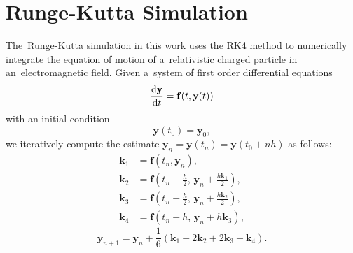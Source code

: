 	\section{Runge-Kutta Simulation}
	\label{sec:rks}
		The~Runge-Kutta simulation in this work uses the \ac{RK4} method to numerically integrate the equation of motion of a~relativistic charged particle in an~electromagnetic field. Given a~system of first order differential equations
			\begin{equation}
				\derivative{\mathbf{y}}{t}(t) = \mathbf{f}(t,\mathbf{y}(t))
			\end{equation}
		with an initial condition
			\begin{equation}
				\mathbf{y}(t_0) = \mathbf{y}_0,
			\end{equation}
		we iteratively compute the estimate $\mathbf{y}_n = \mathbf{y}(t_n) = \mathbf{y}(t_0+nh)$ as follows:
			\begin{align}
				\mathbf{k}_1 &= \mathbf{f}(t_n,\mathbf{y}_n),\\
				\mathbf{k}_2 &= \mathbf{f}\left(t_n+\frac{h}{2},\, \mathbf{y}_n+\frac{h\mathbf{k}_1}{2}\right),\\
				\mathbf{k}_3 &= \mathbf{f}\left(t_n+\frac{h}{2},\, \mathbf{y}_n+\frac{h\mathbf{k}_2}{2}\right),\\
				\mathbf{k}_4 &= \mathbf{f}(t_n+h,\, \mathbf{y}_n+h\mathbf{k}_3),
			\end{align}
			\begin{equation}
				\mathbf{y}_{n+1} = \mathbf{y}_n + \frac{1}{6}(\mathbf{k}_1+2\mathbf{k}_2+2\mathbf{k}_3+\mathbf{k}_4).
			\end{equation}
		

